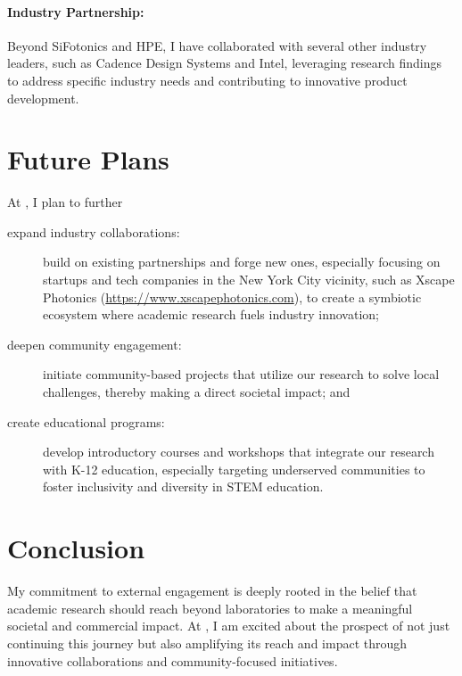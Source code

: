 \paragraph{Industry Partnership:} Beyond SiFotonics and HPE, I have collaborated with several other industry leaders, such as Cadence Design Systems and Intel, leveraging research findings to address specific industry needs and contributing to innovative product development.

\section{Future Plans}

At \appSchool{}, I plan to further

\begin{description}
    \item[expand industry collaborations:] build on existing partnerships and forge new ones, especially focusing on startups and tech companies in the New York City vicinity, such as Xscape Photonics (\url{https://www.xscapephotonics.com}), to create a symbiotic ecosystem where academic research fuels industry innovation;
    \item[deepen community engagement:] initiate community-based projects that utilize our research to solve local challenges, thereby making a direct societal impact; and
    \item[create educational programs:] develop introductory courses and workshops that integrate our research with K-12 education, especially targeting underserved communities to foster inclusivity and diversity in STEM education.
\end{description}

\section{Conclusion}

My commitment to external engagement is deeply rooted in the belief that academic research should reach beyond laboratories to make a meaningful societal and commercial impact. At \appSchool{}, I am excited about the prospect of not just continuing this journey but also amplifying its reach and impact through innovative collaborations and community-focused initiatives.